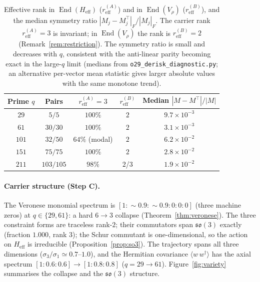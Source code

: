\documentclass[12pt,a4paper]{article}
\theoremstyle{remark}
\DeclareMathOperator{\End}{End}
\newcommand{\Heff}{H_{\mathrm{eff}}}
\newcommand{\Vrho}{V_{\rho}}
\newcommand{\reff}{r_{\mathrm{eff}}}
\begin{document}
      \begin{table}[h]
        \centering
        \begin{tabular}{ccccc}
          \hline
          Prime $q$ & Pairs   & $\reff^{(A)} = 3$ & $\reff^{(B)}$ & Median $|M-M^{\top}|/|M|$ \\
          \hline
          $29$      & $5/5$   & $100\%$           & $2$           & $9.7 \times 10^{-3}$      \\
          $61$      & $30/30$ & $100\%$           & $2$           & $3.1 \times 10^{-3}$      \\
          $101$     & $32/50$ & $64\%$ (modal)    & $2$           & $6.2 \times 10^{-2}$      \\
          $151$     & $75/75$ & $100\%$           & $2$           & $2.8 \times 10^{-2}$      \\
          $211$     & $103/105$ & $98\%$          & $2$/$3$       & $1.9 \times 10^{-2}$      \\
          \hline
        \end{tabular}
        \caption{Effective rank in $\End(\Heff)$ ($\reff^{(A)}$) and in $\End(\Vrho)$ ($\reff^{(B)}$), and the
          median symmetry ratio $|M_j - M_j^{\top}|_F / |M_j|_F$.
          The carrier rank $\reff^{(A)} = 3$ is invariant; in $\End(\Vrho)$ the rank is $\reff^{(B)} = 2$
          (Remark~\ref{rem:restriction}).
          The symmetry ratio is small and decreases with $q$, consistent with the anti-linear parity becoming exact
          in the large-$q$ limit (medians from \texttt{o29\_derisk\_diagnostic.py}; an alternative per-vector mean
          statistic gives larger absolute values with the same monotone trend).}
        \label{tab:results}
      \end{table}

      \paragraph{Carrier structure (Step C).}
      The Veronese monomial spectrum is $[1 : {\sim}0.9 : {\sim}0.9 : 0 : 0 : 0]$ (three machine zeros) at
      $q \in \{29, 61\}$: a hard $6 \to 3$ collapse (Theorem~\ref{thm:veronese}).
      The three constraint forms are traceless rank-$2$; their commutators span $\mathfrak{so}(3)$ exactly
      (fraction $1.000$, rank $3$); the Schur commutant is one-dimensional, so the action on $\Heff$ is irreducible
      (Proposition~\ref{prop:so3}).
      The trajectory spans all three dimensions ($\sigma_3/\sigma_1 \simeq 0.7\text{--}1.0$), and the Hermitian
      covariance $\langle w\, w^{\dagger}\rangle$ has the axial spectrum $[1 : 0.6 : 0.6] \to [1 : 0.8 : 0.8]$
      ($q = 29 \to 61$).
      Figure~\ref{fig:variety} summarises the collapse and the $\mathfrak{so}(3)$ structure.
\end{document}
